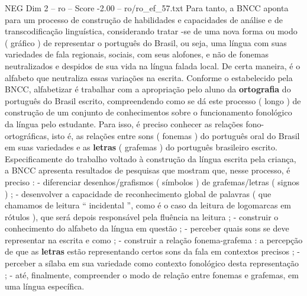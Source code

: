\begin{textsample}{NEG Dim 2 – ro – Score -2.00 – ro/ro\_ef\_57.txt}
Para tanto, a BNCC aponta para um processo de construção de habilidades e capacidades de análise e de transcodificação linguística, considerando tratar -se de uma nova forma ou modo ( gráfico ) de representar o português do Brasil, ou seja, uma língua com suas variedades de fala regionais, sociais, com seus alofones, e não de fonemas neutralizados e despidos de sua vida na língua falada local.
De certa maneira, é o alfabeto que neutraliza essas variações na escrita.
Conforme o estabelecido pela BNCC, alfabetizar é trabalhar com a apropriação pelo aluno da \textbf{ortografia} do português do Brasil escrito, compreendendo como se dá este processo ( longo ) de construção de um conjunto de conhecimentos sobre o funcionamento fonológico da língua pelo estudante.
Para isso, é preciso conhecer as relações fono-ortográficas, isto é, as relações entre sons ( fonemas ) do português oral do Brasil em suas variedades e as \textbf{letras} ( grafemas ) do português brasileiro escrito.
Especificamente do trabalho voltado à construção da língua escrita pela criança, a BNCC apresenta resultados de pesquisas que mostram que, nesse processo, é preciso : - diferenciar desenhos/grafismos ( símbolos ) de grafemas/letras ( signos ) ; - desenvolver a capacidade de reconhecimento global de palavras ( que chamamos de leitura “ incidental ”, como é o caso da leitura de logomarcas em rótulos ), que será depois responsável pela fluência na leitura ; - construir o conhecimento do alfabeto da língua em questão ; - perceber quais sons se deve representar na escrita e como ; - construir a relação fonema-grafema : a percepção de que as \textbf{letras} estão representando certos sons da fala em contextos precisos ; - perceber a sílaba em sua variedade como contexto fonológico desta representação ; - até, finalmente, compreender o modo de relação entre fonemas e grafemas, em uma língua específica.

\end{textsample}
